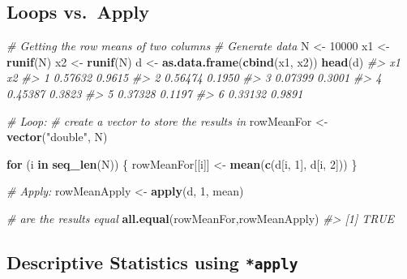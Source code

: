 \documentclass[]{book}
\makeatletter
\newenvironment{Shaded}{\begin{snugshade}}{\end{snugshade}}
\newcommand{\KeywordTok}[1]{\textcolor[rgb]{0.13,0.29,0.53}{\textbf{#1}}}
\newcommand{\DecValTok}[1]{\textcolor[rgb]{0.00,0.00,0.81}{#1}}
\newcommand{\StringTok}[1]{\textcolor[rgb]{0.31,0.60,0.02}{#1}}
\newcommand{\CommentTok}[1]{\textcolor[rgb]{0.56,0.35,0.01}{\textit{#1}}}
\newcommand{\ControlFlowTok}[1]{\textcolor[rgb]{0.13,0.29,0.53}{\textbf{#1}}}
\newcommand{\NormalTok}[1]{#1}
\newenvironment{kframe}{%
\medskip{}
\setlength{\fboxsep}{.8em}
 \def\at@end@of@kframe{}%
 \ifinner\ifhmode%
  \def\at@end@of@kframe{\end{minipage}}%
  \begin{minipage}{\columnwidth}%
 \fi\fi%
 \def\FrameCommand##1{\hskip\@totalleftmargin \hskip-\fboxsep
 \colorbox{shadecolor}{##1}\hskip-\fboxsep
     \hskip-\linewidth \hskip-\@totalleftmargin \hskip\columnwidth}%
 \MakeFramed {\advance\hsize-\width
   \@totalleftmargin\z@ \linewidth\hsize
   \@setminipage}}%
 {\par\unskip\endMakeFramed%
 \at@end@of@kframe}
\renewenvironment{Shaded}{\begin{kframe}}{\end{kframe}}
\makeatother
\begin{document}
\subsection{Loops vs.~Apply}\label{loops-vs.apply}

\begin{Shaded}
\begin{Highlighting}[]

\CommentTok{# Getting the row means of two columns}
\CommentTok{# Generate data}
\NormalTok{N <-}\StringTok{ }\DecValTok{10000}
\NormalTok{x1 <-}\StringTok{ }\KeywordTok{runif}\NormalTok{(N)}
\NormalTok{x2 <-}\StringTok{ }\KeywordTok{runif}\NormalTok{(N)}
\NormalTok{d <-}\StringTok{ }\KeywordTok{as.data.frame}\NormalTok{(}\KeywordTok{cbind}\NormalTok{(x1, x2))}
\KeywordTok{head}\NormalTok{(d)}
\CommentTok{#>        x1     x2}
\CommentTok{#> 1 0.57632 0.9615}
\CommentTok{#> 2 0.56474 0.1950}
\CommentTok{#> 3 0.07399 0.3001}
\CommentTok{#> 4 0.45387 0.3823}
\CommentTok{#> 5 0.37328 0.1197}
\CommentTok{#> 6 0.33132 0.9891}

\CommentTok{# Loop:}
\CommentTok{# create a vector to store the results in }
\NormalTok{rowMeanFor <-}\StringTok{ }\KeywordTok{vector}\NormalTok{(}\StringTok{"double"}\NormalTok{, N)}

\ControlFlowTok{for}\NormalTok{ (i }\ControlFlowTok{in} \KeywordTok{seq_len}\NormalTok{(N)) \{}
\NormalTok{        rowMeanFor[[i]] <-}\StringTok{ }\KeywordTok{mean}\NormalTok{(}\KeywordTok{c}\NormalTok{(d[i, }\DecValTok{1}\NormalTok{], d[i, }\DecValTok{2}\NormalTok{]))}
\NormalTok{\}}

\CommentTok{# Apply:}
\NormalTok{rowMeanApply <-}\StringTok{ }\KeywordTok{apply}\NormalTok{(d, }\DecValTok{1}\NormalTok{, mean)}

\CommentTok{# are the results equal}
\KeywordTok{all.equal}\NormalTok{(rowMeanFor,rowMeanApply)}
\CommentTok{#> [1] TRUE}
\end{Highlighting}
\end{Shaded}

\subsection{\texorpdfstring{Descriptive Statistics using
\texttt{*apply}}{Descriptive Statistics using *apply}}\label{descriptive-statistics-using-apply}
\end{document}
